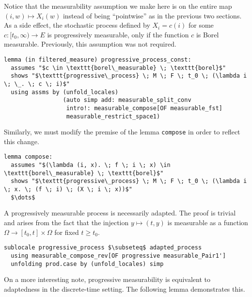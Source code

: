Notice that the measurability assumption we make here is on the entire map $(i, w) \mapsto X_i(w)$ instead of being ``pointwise'' as in the previous two sections. As a side effect, the stochastic process defined by $X_i = c(i)$ for some $c : [t_0, \infty) \rightarrow E$ is progressively measurable, only if the function $c$ is Borel measurable. Previously, this assumption was not required.

\begin{isalemma}
{\small
\begin{lstlisting}[style=isabelle]
lemma (in filtered_measure) progressive_process_const:
  assumes "$c \in \texttt{borel\_measurable} \; \texttt{borel}$"
  shows "$\texttt{progressive\_process} \; M \; F \; t_0 \; (\lambda i \; \_. \; c \; i)$"
  using assms by (unfold_locales) 
				 (auto simp add: measurable_split_conv 
				  intro!: measurable_compose[OF measurable_fst] 
				  measurable_restrict_space1)
  \end{lstlisting}
}
\end{isalemma}

Similarly, we must modify the premise of the lemma \texttt{compose} in order to reflect this change.

\begin{isalemma}
{\small
\begin{lstlisting}[style=isabelle]
lemma compose:
  assumes "$(\lambda (i, x). \; f \; i \; x) \in \texttt{borel\_measurable} \; \texttt{borel}$"
  shows "$\texttt{progressive\_process} \; M \; F \; t_0 \; (\lambda i \; x. \; (f \; i) \; (X \; i \; x))$"
  $\dots$
  \end{lstlisting}
}
\end{isalemma}

A progressively measurable process is necessarily adapted. The proof is trivial and arises from the fact that the injection $y \mapsto (t, y)$ is measurable as a function $\Omega \rightarrow [t_0, t] \times \Omega$ for fixed $t \ge t_0$.

\begin{isalemma}
{\small
\begin{lstlisting}[style=isabelle]
sublocale progressive_process $\subseteq$ adapted_process 
  using measurable_compose_rev[OF progressive measurable_Pair1'] 
  unfolding prod.case by (unfold_locales) simp
\end{lstlisting}
}
\end{isalemma}

On a more interesting note, progressive measurability is equivalent to adaptedness in the discrete-time setting. The following lemma demonstrates this.

